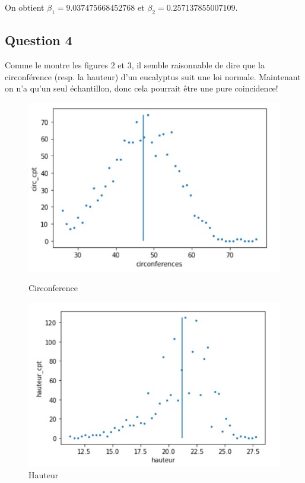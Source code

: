 \documentclass[]{book}
\theoremstyle{definition}
\begin{document}
On obtient $\beta_1 =  9.037475668452768$  et $\beta_2 = 0.257137855007109$.

\subsection*{Question 4}
Comme le montre les figures 2 et 3, il semble raisonnable de dire que la circonf\'erence (resp. la hauteur) d'un eucalyptus suit une loi normale. Maintenant on n'a qu'un seul \'echantillon, donc cela pourrait \^etre une pure coincidence!

\begin{figure}
    \centering
    \begin{minipage}{0.45\textwidth}
        \centering
            \includegraphics[scale=0.5]{circ_normale.jpg}
            \caption{Circonference}
            \label{fig:Circonference}
    \end{minipage}\hfill
    \begin{minipage}{0.45\textwidth}
        \centering
        \includegraphics[scale=0.5]{hauteur_normale.jpg}
        \caption{Hauteur}
        \label{fig:Hauteur}
    \end{minipage}
\end{figure}
\end{document}
